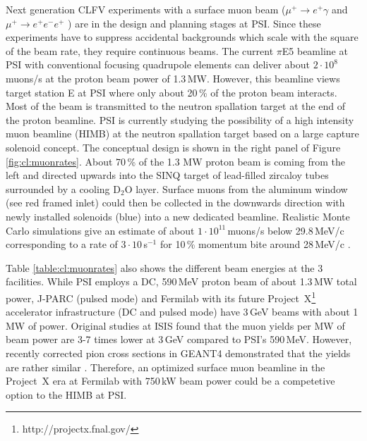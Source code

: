 Next generation CLFV experiments with a surface muon beam ($\mu^+ \to e^+\gamma$ \cite{Baldini:2013ke} and $\mu^+ \to e^+e^-e^+$ \cite{Blondel:2013ia}) are in the design and planning stages at PSI. Since these experiments have to suppress accidental backgrounds which scale with the square of the beam rate, they require continuous beams. The current $\pi$E5 beamline at PSI with conventional focusing quadrupole elements can deliver about $2\cdot10^8$\,muons/s at the proton beam power of 1.3\,MW. However, this beamline views target station E \cite{Heidenreich:2002zz} at PSI where only about 20\,\% of the proton beam interacts. Most of the beam is transmitted to the neutron spallation target at the end of the proton beamline. PSI is currently studying the possibility of a high intensity muon beamline (HIMB) at the neutron spallation target based on a large capture solenoid concept. The conceptual design is shown in the right panel of Figure \ref{fig:cl:muonrates}. About 70\,\% of the 1.3 MW proton beam is coming from the left and directed upwards into the SINQ target of lead-filled zircaloy tubes surrounded by a cooling D$_2$O layer. Surface muons from the aluminum window (see red framed inlet) could then be collected in the downwards direction with newly installed solenoids (blue) into a new dedicated beamline. Realistic Monte Carlo simulations give an estimate of about $1\cdot10^{11}$\,muons/s below 29.8\,MeV/c corresponding to a rate of $3\cdot 10$\,s$^{-1}$ for 10\,\% momentum bite around 28\,MeV/c \cite{Blondel:2013ia}.

Table \ref{table:cl:muonrates} also shows the different beam energies at the 3 facilities. While PSI employs a DC, 590\,MeV proton beam of about 1.3\,MW total power, J-PARC (pulsed mode) and Fermilab with its future Project~X\footnote{http://projectx.fnal.gov/} accelerator infrastructure (DC and pulsed mode) have 3\,GeV beams with about 1\,MW of power. Original studies at ISIS \cite{Bungau:2013hd} found that the muon yields per MW of beam power are 3-7 times lower at 3\,GeV compared to PSI's 590\,MeV. However, recently corrected pion cross sections in GEANT4 demonstrated that the yields are rather similar \cite{striganov:12}. Therefore, an optimized surface muon beamline in the Project~X era at Fermilab with 750\,kW beam power could be a competetive option to the HIMB at PSI. 

